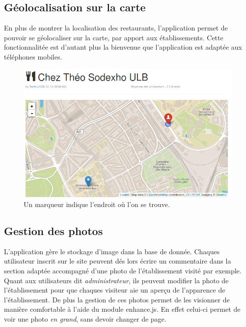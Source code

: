 \documentclass[a4paper,10pt]{article}
\begin{document}
\subsection{Géolocalisation sur la carte}
    En plus de montrer la localisation des restaurants, l'application permet
    de pouvoir se géolocaliser sur la carte, par apport aux établissements.
    \newline
    Cette fonctionnalitée est d'autant plus la bienvenue que l'application est
    adaptée aux téléphones mobiles.

    \begin{figure}[hbt]
        \centering
        \includegraphics[scale=0.4]{./images/geolocalisation.png}
        \caption{Un marqueur indique l'endroit où l'on se trouve.}
    \end{figure}


\subsection{Gestion des photos}
    L'application gère le stockage d'image dans la base de donnée.
    Chaques utilisateur inscrit sur le site peuvent dés lors écrire un
    commentaire dans la section adaptée accompagné d'une photo de
    l'établissement visité par exemple. \newline
    Quant aux utilisateurs dit \emph{administrateur}, ils peuvent modifier
    la photo de l'établissement pour que chaques visiteur aie un aperçu de
    l'apparence de l'établissement. \newline
    De plus la gestion de ces photos permet de les visionner de manière
    comfortable à l'aide du module enhance.js. En effet celui-ci permet de voir
    une photo \emph{en grand}, sans devoir changer de page.
\end{document}
